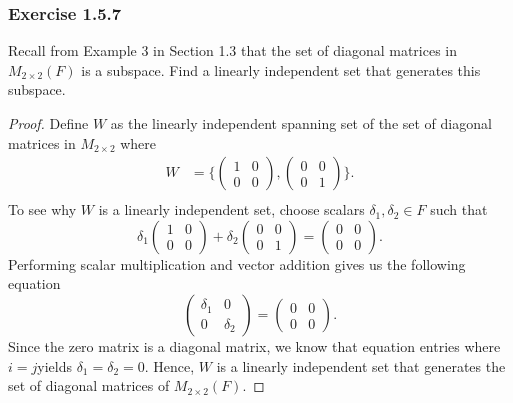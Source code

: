 \subsubsection{Exercise 1.5.7} Recall from Example 3 in Section 1.3 that the set of diagonal matrices in \( M_{2 \times 2 }(F) \) is a subspace. Find a linearly independent set that generates this subspace.
\begin{proof}
Define \( W  \) as the linearly independent spanning set of the set of diagonal matrices in  \( M_{2 \times 2 } \) where 
\begin{align*}
    W &= \Bigg\{ \begin{pmatrix}
            1 & 0 \\
            0 & 0 
    \end{pmatrix} , \begin{pmatrix}
            0 & 0 \\
            0 & 1 
    \end{pmatrix} \Bigg\}. \\
\end{align*}
To see why \( W  \) is a linearly independent set, choose scalars \( \delta_{1} , \delta_{2} \in F  \) such that 
\[  \delta_{1} \begin{pmatrix}
    1 & 0 \\
    0 & 0 
\end{pmatrix}  + \delta_{2} \begin{pmatrix}
    0 & 0 \\
    0 & 1 
\end{pmatrix} = \begin{pmatrix}
    0 & 0 \\
    0 & 0 
\end{pmatrix}.\]
Performing scalar multiplication and vector addition gives us the following equation 
\[  \begin{pmatrix}
    \delta_1 & 0 \\ 
    0 & \delta_2  
\end{pmatrix}  = \begin{pmatrix}
    0 & 0 \\
    0 & 0 
\end{pmatrix}. \]
Since the zero matrix is a diagonal matrix, we know that equation entries where  \( i = j    \)yields \( \delta_{1} = \delta_{2} = 0 \). Hence, \( W  \) is a linearly independent set that generates the set of diagonal matrices of \( M_{2 \times 2 }(F ) \).
\end{proof}

